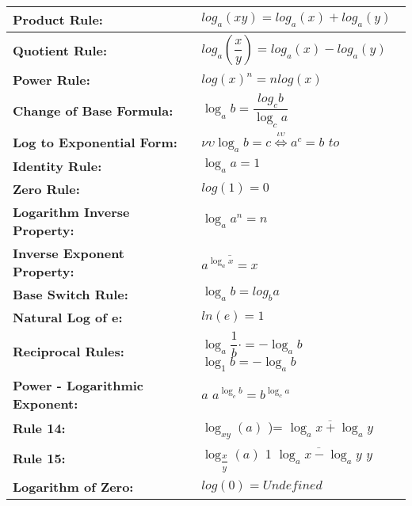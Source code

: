 \documentclass[openany]{book}
\begin{document}
\begin{tabular}{| l | l |}
	\hline
	\textbf{Product Rule:}                 & \(log_{a}(xy)=log_{a}(x)+log_{a}(y)\)                                                                       \\
	\hline
	\textbf{Quotient Rule:}                & \(log_{a}(\dfrac{x}{y})=log_{a}(x)-log_{a}(y)\)                                                             \\
	\hline
	\textbf{Power Rule:}                   & \(log( x) ^{n}= n log( x)\)                                                                                 \\
	\hline
	\textbf{Change of Base Formula:}       & \(\log_ab=\dfrac{log_cb}{\log_ca}\)                                                                         \\
	\hline
	\textbf{Log to Exponential Form:}      & \(\nu\upsilon \log _{a}b= c\overset {\iota \upsilon }{\operatorname* { \Leftrightarrow } }a^{c}= b\) \(to\) \\
	\hline
	\textbf{Identity Rule:}                & \(\log_{a}a=1\)                                                                                             \\
	\hline
	\textbf{Zero Rule:}                    & \(log(1)=0\)                                                                                                \\
	\hline
	\textbf{Logarithm Inverse Property:}   & \(\log_{a}a^{n}=n\)                                                                                         \\
	\hline
	\textbf{Inverse Exponent Property:}    & \({\overline{a^{\log_{a}x}=x}}\)                                                                            \\
	\hline
	\textbf{Base Switch Rule:}
	                                       & 
	\(\log_{a}b=log_ba\)
	\\
	\hline
	\textbf{Natural Log of e:}             & \(ln(e)=1\)                                                                                                 \\
	\hline
	\textbf{Reciprocal Rules:}             & \(\log_{a}\dfrac{1}{b}\cdot=-\log_{a}b\) \(\log_{1}b=-\log_{a}b\)                                           \\
	\hline
	\textbf{Power - Logarithmic Exponent:} & \(a\) \(a^{\log_{c}b}=b^{\log_{c}a}\)                                                                       \\ 
	\hline
	\textbf{Rule 14:}                      & \(\log_{xy}(a)\) )= \({\overline{\log_{a}x+\log_{a}y}}\)                                                    \\ 
	\hline
	\textbf{Rule 15:}                      & \(\log_{\dfrac{x}{y}}(a)\) 1 \(\overline{\log_{a}x-\log_{a}y}\) \(y\)                                       \\ 
	\hline
	\textbf{Logarithm of Zero:}
	                                       & 
	\(log(0)=Undefined\)
	\\ 
	\hline
\end{tabular}
\end{document}
